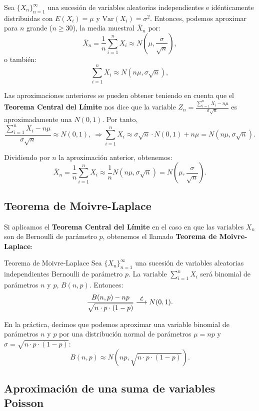\documentclass[]{book}
\begin{document}
Sea \(\{X_n\}_{n=1}^\infty\) una sucesión de variables aleatorias independientes e idénticamente distribuidas con \(E(X_i)=\mu\) y \(\mathrm{Var}(X_i)=\sigma^2\). Entonces, podemos aproximar para \(n\) grande (\(n\geq 30\)), la media muestral \(\overline{X}_n\) por:
\[
\overline{X}_n =\frac{1}{n}\sum_{i=1}^n X_i \approx N\left(\mu,\frac{\sigma}{\sqrt{n}}\right),
\]
o también:
\[
\sum_{i=1}^n X_i \approx N\left(n\mu,\sigma\sqrt{n}\right),
\]

Las aproximaciones anteriores se pueden obtener teniendo en cuenta que el \textbf{Teorema Central del Límite} nos dice que la variable
\(Z_n= \frac{\sum\limits_{i=1}^n X_i-n\mu}{\sigma\sqrt{n}}\) es aproximadamente una \(N(0,1)\). Por tanto,
\[
\frac{\sum\limits_{i=1}^n X_i-n\mu}{\sigma\sqrt{n}} \approx N(0,1),\ \Rightarrow \sum_{i=1}^n X_i\approx \sigma\sqrt{n}\cdot N(0,1)+n\mu = N\left(n\mu,\sigma\sqrt{n}\right).
\]

Dividiendo por \(n\) la aproximación anterior, obtenemos:
\[
\overline{X}_n =\frac{1}{n}\sum_{i=1}^n X_i \approx \frac{1}{n}N\left(n\mu,\sigma\sqrt{n}\right) =N\left(\mu,\frac{\sigma}{\sqrt{n}}\right).
\]

\hypertarget{teorema-de-moivre-laplace}{%
\subsection{Teorema de Moivre-Laplace}\label{teorema-de-moivre-laplace}}

Si aplicamos el \textbf{Teorema Central del Límite} en el caso en que las variables \(X_n\) son de Bernoulli de parámetro \(p\), obtenemos el llamado \textbf{Teorema de Moivre-Laplace}:

 Teorema de Moivre-Laplace
Sea \(\{X_n\}_{n=1}^\infty\) una sucesión de variables aleatorias independientes Bernoulli de parámetro \(p\). La variable \(\sum\limits_{i=1}^n X_i\) será binomial de parámetros \(n\) y \(p\), \(B(n,p)\). Entonces:
\[
\frac{B(n,p)-np}{\sqrt{n\cdot p\cdot (1-p)}}\stackrel{{\cal L}}{\longrightarrow} N(0,1).
\]

En la práctica, decimos que podemos aproximar una variable binomial de parámetros \(n\) y \(p\) por una distribución normal de parámetros \(\mu=np\) y \(\sigma =\sqrt{n\cdot p\cdot (1-p)}\):
\[
B(n,p)\approx N(np,\sqrt{n\cdot p\cdot (1-p)}).
\]

\hypertarget{aproximaciuxf3n-de-una-suma-de-variables-poisson}{%
\subsection{Aproximación de una suma de variables Poisson}\label{aproximaciuxf3n-de-una-suma-de-variables-poisson}}
\end{document}

